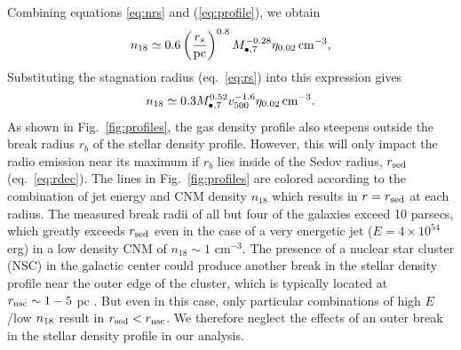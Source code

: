\documentclass[usenatbib,fleqn]{mnras}
\newcommand{\Mbh}[1][]{M_{\bullet#1}}
\begin{document}
Combining equations \eqref{eq:nrs} and (\ref{eq:profile}), we obtain
\begin{equation}
  n_{18}\simeq 0.6 \left(\frac{r_s}{\rm pc}\right)^{0.8}
  \Mbh[,7]^{-0.28} \eta_{0.02} \, {\rm cm^{-3}},
  \label{eq:n18}
\end{equation}
%
Substituting the stagnation radius (eq.~\ref{eq:rs}) into this
expression gives
\begin{equation}
  n_{18}\simeq 0.3 \Mbh[,7]^{0.52} v_{500}^{-1.6} \eta_{0.02} \, {\rm
    cm^{-3}}.
\label{eq:n182}
\end{equation} 
%
As shown in Fig.~\ref{fig:profiles}, the gas density profile also
steepens outside the break radius $r_b$ of the stellar density
profile.  However, this will only impact the radio emission near its
maximum if $r_b$ lies inside of the Sedov radius, $r_{\rm sed}$
(eq.~\ref{eq:rdec}).  The lines in Fig.~\ref{fig:profiles} are colored
according to the combination of jet energy and CNM density $n_{18}$
which results in $r = r_{\rm sed}$ at each radius.  The measured break
radii of all but four of the \citet{Lauer+2007} galaxies exceed 10
parsecs, which greatly exceeds $r_{\rm sed}$ even in the case of a
very energetic jet ($E=4\times 10^{54}$ erg) in a low density CNM of
$n_{18} \sim 1$ cm$^{-3}$.  The presence of a nuclear star cluster
(NSC) in the galactic center could produce another break in the
stellar density profile near the outer edge of the cluster, which is
typically located at $r_{\rm nsc} \sim 1-5$ pc \citep{Georgiev+2014}.
But even in this case, only particular combinations of high $E$/low
$n_{\rm 18}$ result in $r_{\rm sed} < r_{\rm nsc}$.  We therefore
neglect the effects of an outer break in the stellar density profile
in our analysis.
\end{document}

